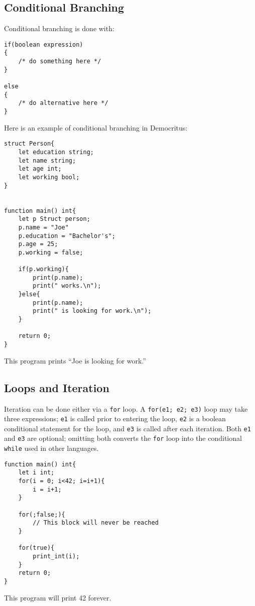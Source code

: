 	\subsection{Conditional Branching}
		Conditional branching is done with:

		\begin{lstlisting}
if(boolean expression) 
{ 
	/* do something here */
}

else
{
	/* do alternative here */
}
		\end{lstlisting}
	
		\medskip \noindent
		Here is an example of conditional branching in Democritus:

		\begin{lstlisting}
struct Person{
	let education string;
	let name string;
	let age int;
	let working bool;
}


function main() int{
	let p Struct person;
	p.name = "Joe"
	p.education = "Bachelor's";
	p.age = 25;
	p.working = false;

	if(p.working){
		print(p.name);
		print(" works.\n");
	}else{
		print(p.name);
		print(" is looking for work.\n");
	}

	return 0;
}
		\end{lstlisting}

		\medskip \noindent
		This program prints ``Joe is looking for work.''

	\subsection{Loops and Iteration}
		Iteration can be done either via a \texttt{for} loop. A \texttt{for(e1; e2; e3)} loop may take three expressions; \texttt{e1} is called prior to entering the loop, \texttt{e2} is a boolean conditional statement for the loop, and \texttt{e3} is called after each iteration. Both \texttt{e1} and \texttt{e3} are optional; omitting both converts the \texttt{for} loop into the conditional \texttt{while} used in other languages.

		\begin{lstlisting}
function main() int{
	let i int;
	for(i = 0; i<42; i=i+1){
		i = i+1;
	}

	for(;false;){
		// This block will never be reached
	}

	for(true){
		print_int(i);
	}
	return 0;
}
		\end{lstlisting}

		\medskip \noindent
		This program will print 42 forever.



